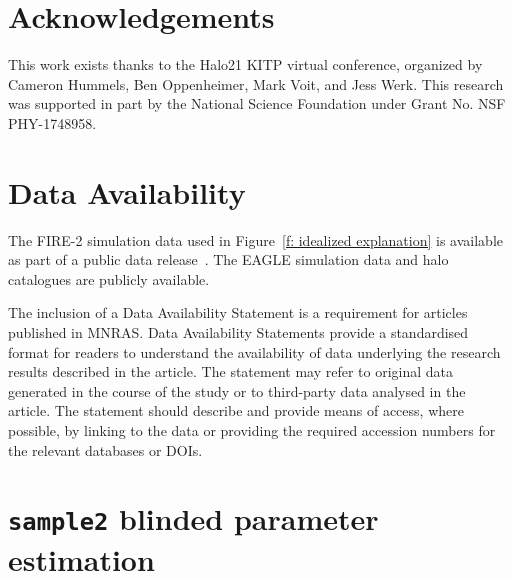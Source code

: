 \documentclass[fleqn,usenatbib]{mnras}
\begin{document}
\section*{Acknowledgements}

This work exists thanks to the Halo21 KITP virtual conference, organized by Cameron Hummels, Ben Oppenheimer, Mark Voit, and Jess Werk.
This research was supported in part by the National Science Foundation under Grant No. NSF PHY-1748958.

\section*{Data Availability}

The FIRE-2 simulation data used in Figure~\ref{f: idealized explanation} is available as part of a public data release~\citep{wetzel2022Public}.
The EAGLE simulation data \citep{EagleTeam2017} and halo catalogues \citep{McAlpine2016} are publicly available. 

The inclusion of a Data Availability Statement is a requirement for articles published in MNRAS. Data Availability Statements provide a standardised format for readers to understand the availability of data underlying the research results described in the article. The statement may refer to original data generated in the course of the study or to third-party data analysed in the article. The statement should describe and provide means of access, where possible, by linking to the data or providing the required accession numbers for the relevant databases or DOIs.







\appendix

\section{\texttt{sample2} blinded parameter estimation}
\label{a: sample2 blinded}
\end{document}
